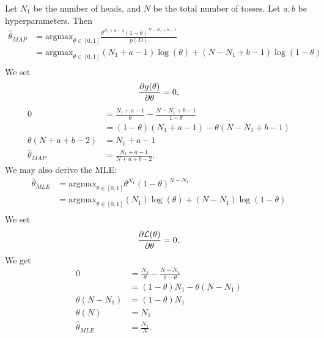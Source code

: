 \documentclass{chaistyle}
\begin{document}
\begin{example*}
    Let \(N_1\) be the number of heads, and \(N\) be the total number of tosses. Let \(a,b\) be hyperparameters. Then \begin{align*}
        \hat\theta_{MAP} &= \text{argmax}_{\theta\in[0,1]}\frac{\theta^{N_1+a-1}(1-\theta)^{N-N_1+b-1}}{p(D)} \\ 
        &= \text{argmax}_{\theta\in[0,1]}(N_1+a-1)\log(\theta)+(N-N_1+b-1)\log(1-\theta) \\ 
    \end{align*}
    We set \[\frac{\partial g(\theta)}{\partial \theta}=0.\]
    \begin{align*}
        0 &= \frac{N_1+a-1}{\theta}-\frac{N-N_1+b-1}{1-\theta} \\
        &= (1-\theta)(N_1+a-1)-\theta(N-N_1+b-1) \\
        \theta(N+a+b-2) &= N_1+a-1 \\ 
        \hat\theta_{MAP} &= \frac{N_1+a-1}{N+a+b-2}.
    \end{align*}
    We may also derive the MLE: \begin{align*}
        \hat\theta_{MLE} &= \text{argmax}_{\theta\in[0,1]}\theta^{N_1}(1-\theta)^{N-N_1} \\
        &= \text{argmax}_{\theta\in[0,1]}(N_1)\log(\theta)+(N-N_1)\log(1-\theta) \\
    \end{align*}
    We set \[\frac{\partial \mathcal{L}(\theta)}{\partial \theta}=0.\] We get \begin{align*}
        0 &= \frac{N_1}{\theta}-\frac{N-N_1}{1-\theta} \\
        &= (1-\theta)N_1-\theta(N-N_1) \\
        \theta(N-N_1) &= (1-\theta)N_1\ \\
        \theta(N) &= N_1 \\
        \hat\theta_{MLE} &= \frac{N_1}{N}.
    \end{align*}
\end{example*}
\end{document}
